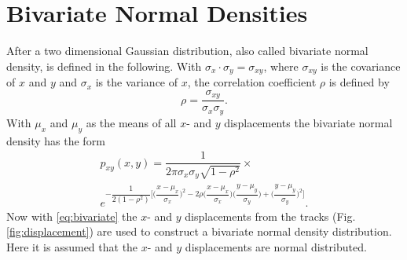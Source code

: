 \documentclass[11pt,twoside,a4paper,fleqn,x11names]{report}
\numberwithin{equation}{chapter}
\numberwithin{figure}{chapter}
\numberwithin{table}{chapter}
\begin{document}
\section{Bivariate Normal Densities}
\label{subsec:bivar}
After \cite{duda} a two dimensional Gaussian distribution, also called bivariate normal density, is defined in the following.
With $\sigma_x \cdot\sigma_y = \sigma_{xy}$, where $\sigma_{xy}$ is the covariance of $x$ and $y$ and $\sigma_{x}$ is the variance of $x$, the correlation coefficient $\rho$ is defined by
\begin{equation}
	\rho = \dfrac{\sigma_{xy}}{\sigma_x\sigma_y}.
\end{equation}
With $\mu_x$ and $\mu_y$ as the means of all $x$- and $y$ displacements the bivariate normal density has the form
\begin{equation}
	\begin{multlined}
		p_{xy}(x,y)=\dfrac{1}{2\pi\sigma_x\sigma_y\sqrt{1-\rho^2}} \times \\ e^{-\dfrac{1}{2(1-\rho^2)}\bigg[\bigg(\dfrac{x-\mu_x}{\sigma_x}\bigg)^2-2\rho\bigg(\dfrac{x-\mu_x}{\sigma_x}\bigg)\bigg(\dfrac{y-\mu_y}{\sigma_y}\bigg)+\bigg(\dfrac{y-\mu_y}{\sigma_y}\bigg)^2\bigg]}.
	\end{multlined}
	\label{eq:bivariate}
\end{equation}
Now with \ref{eq:bivariate} the $x$- and $y$ displacements from the tracks (Fig. \ref{fig:displacement}) are used to construct a bivariate normal density distribution. Here it is assumed that the $x$- and $y$ displacements are normal distributed.
\end{document}

